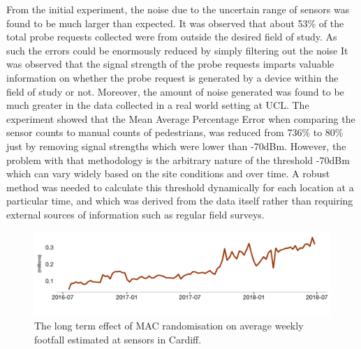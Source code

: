 From the initial experiment, the noise due to the uncertain range of sensors was found to be much larger than expected.
It was observed that about 53\% of the total probe requests collected were from  outside the desired field of study.
As such the errors could be enormously reduced by simply filtering out the noise %
It was observed that the signal strength of the probe requests imparts valuable information on whether the probe request is generated by a device within the field of study or not.
Moreover, the amount of noise generated was found to be much greater in the data collected in a real world setting at UCL.
The experiment showed that the Mean Average Percentage Error when comparing the sensor counts to manual counts of pedestrians, was reduced from 736\% to  80\% just by removing signal strengths which were lower than -70dBm.
However, the problem with that methodology is the arbitrary nature of the threshold -70dBm which can vary widely based on the site conditions and over time.
A robust method was needed to calculate this threshold dynamically for each location at a particular time, and which was derived from the data itself rather than requiring external sources of information such as regular field surveys.

\begin{figure}
  \includegraphics[trim={0 0 0 0},clip]{images/processing-error-randomisation.png}
  \caption{The long term effect of MAC randomisation on average weekly footfall estimated at sensors in Cardiff.}
  \label{figure:processing:error:random}
\end{figure}

